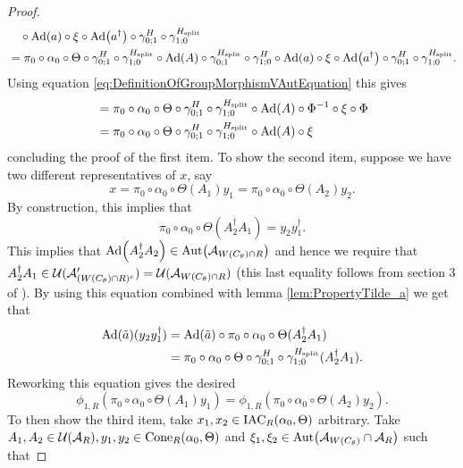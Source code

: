 \documentclass[11pt,a4paper,twoside]{article}
\numberwithin{equation}{section}
\begin{document}
\begin{proof}
\begin{align}
			\nonumber
			&\quad\circ\Ad{a}\circ\xi\circ\Ad{a^\dagger}\circ\gamma^H_{0;1}\circ\gamma^{\Hsplit}_{1;0}\\
			&=\pi_0\circ\alpha_0\circ\Theta\circ\gamma^H_{0;1}\circ\gamma^{\Hsplit}_{1;0}\circ\Ad{A}\circ\gamma^{\Hsplit}_{0;1}\circ\gamma^H_{1;0}\circ\Ad{a}\circ\xi\circ\Ad{a^\dagger}\circ\gamma^H_{0;1}\circ\gamma^{\Hsplit}_{1;0}.
		\end{align}
		Using equation \eqref{eq:DefinitionOfGroupMorphismVAutEquation} this gives
		\begin{align}
			&=\pi_0\circ\alpha_0\circ\Theta\circ\gamma^H_{0;1}\circ\gamma^{\Hsplit}_{1;0}\circ\Ad{A}\circ\Phi^{-1}\circ\xi\circ\Phi\\
			&=\pi_0\circ\alpha_0\circ\Theta\circ\gamma^H_{0;1}\circ\gamma^{\Hsplit}_{1;0}\circ\Ad{A}\circ\xi
		\end{align}
		concluding the proof of the first item. To show the second item, suppose we have two different representatives of $x$, say
		\begin{equation}
			x=\pi_0\circ\alpha_0\circ\Theta(A_1)y_1=\pi_0\circ\alpha_0\circ\Theta(A_2)y_2.
		\end{equation}
		By construction, this implies that
		\begin{equation}\label{eq:ProofThatphi1IsIndependentOfChoiceOfRepresentative}
			\pi_0\circ\alpha_0\circ\Theta(A_2^\dagger A_1)=y_2 y_1^\dagger.
		\end{equation}
		This implies that $\Ad{A_2^\dagger A_2}\in\Aut{\AA_{W(C_\theta)\cap R}}$ and hence we require that $A_2^\dagger A_1\in\mathcal U(\mathcal A_{(W(C_\theta)\cap R)^c}')=\mathcal U(\mathcal A_{W(C_\theta)\cap R})$ (this last equality follows from section 3 of \cite{NaScWe_2013}). By using this equation combined with lemma \ref{lem:PropertyTilde_a} we get that
		\begin{align}
			\Ad{\tilde{a}}(y_2y_1^\dagger)&=\Ad{\tilde{a}}\circ\pi_0\circ\alpha_0\circ\Theta(A_2^\dagger A_1)\\
			&=\pi_0\circ\alpha_0\circ\Theta\circ\gamma^H_{0;1}\circ\gamma^{\Hsplit}_{1;0}(A_2^\dagger A_1).
		\end{align}
		Reworking this equation gives the desired
		\begin{equation}
			\phi_{1,R}(\pi_0\circ\alpha_0\circ\Theta(A_1)y_1)=\phi_{1,R}(\pi_0\circ\alpha_0\circ\Theta(A_2)y_2).
		\end{equation}
		To then show the third item, take $x_1,x_2\in \textrm{IAC}_R(\alpha_0,\Theta)$ arbitrary. Take $A_1,A_2\in\mathcal U(\mathcal A_R),y_1,y_2\in \textrm{Cone}_R(\alpha_0,\Theta)$ and $\xi_1,\xi_2\in\Aut{\AA_{W(C_\theta)}\cap\AA_R}$ such that

\end{proof}
\end{document}
